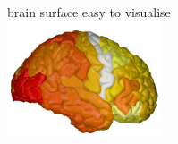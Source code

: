 \documentclass[10pt,xcolor=table,aspectratio=169]{beamer}
\begin{document}
\begin{frame}
\begin{figure}
\begin{subfigure}[t]{0.3\textwidth}
\myyes brain surface easy to visualise\\
\includegraphics[width=0.5\textwidth]{images/cortical-outer_0} 


\end{subfigure}

\end{figure}
 
\end{frame}
\end{document}
